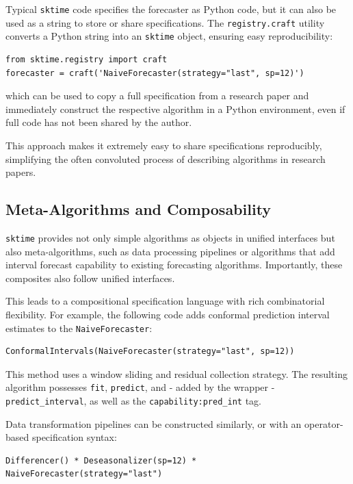 Typical \texttt{sktime} code specifies the forecaster as Python code, but it can also be used as a string to store or share specifications. The \texttt{registry.craft} utility converts a Python string into an \texttt{sktime} object, ensuring easy reproducibility:

\begin{verbatim}
from sktime.registry import craft
forecaster = craft('NaiveForecaster(strategy="last", sp=12)')
\end{verbatim}
which can be used to copy a full specification from a research paper and immediately construct the respective algorithm in a Python environment, even if full code has not been shared by the author.

This approach makes it extremely easy to share specifications reproducibly, simplifying the often convoluted process of describing algorithms in research papers.

\subsection{Meta-Algorithms and Composability}
\texttt{sktime} provides not only simple algorithms as objects in unified interfaces but also meta-algorithms, such as data processing pipelines or algorithms that add interval forecast capability to existing forecasting algorithms. Importantly, these composites also follow unified interfaces.

This leads to a compositional specification language with rich combinatorial flexibility. For example, the following code adds conformal prediction interval estimates to the \texttt{NaiveForecaster}:

\begin{verbatim}
ConformalIntervals(NaiveForecaster(strategy="last", sp=12))
\end{verbatim}

This method uses a window sliding and residual collection strategy.
The resulting algorithm possesses \texttt{fit}, \texttt{predict}, and - added by the wrapper - \texttt{predict\_interval}, as well as the \texttt{capability:pred\_int} tag.

Data transformation pipelines can be constructed similarly, or with an operator-based specification syntax:

\begin{verbatim}
Differencer() * Deseasonalizer(sp=12) * NaiveForecaster(strategy="last")
\end{verbatim}

